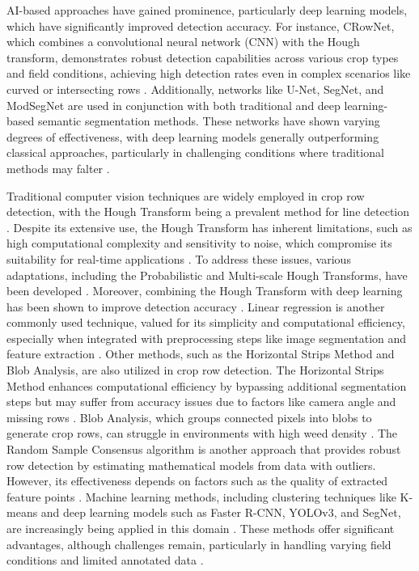 \documentclass[conference]{IEEEtran}
\begin{document}
AI-based approaches have gained prominence, particularly deep learning models, which have significantly improved detection accuracy. For instance, CRowNet, which combines a convolutional neural network (CNN) with the Hough transform, demonstrates robust detection capabilities across various crop types and field conditions, achieving high detection rates even in complex scenarios like curved or intersecting rows \cite{b8,b14}. Additionally, networks like U-Net, SegNet, and ModSegNet are used in conjunction with both traditional and deep learning-based semantic segmentation methods. These networks have shown varying degrees of effectiveness, with deep learning models generally outperforming classical approaches, particularly in challenging conditions where traditional methods may falter \cite{b5,b13}.

Traditional computer vision techniques are widely employed in crop row detection, with the Hough Transform being a prevalent method for line detection \cite{b2,b15}. Despite its extensive use, the Hough Transform has inherent limitations, such as high computational complexity and sensitivity to noise, which compromise its suitability for real-time applications \cite{b2}. To address these issues, various adaptations, including the Probabilistic and Multi-scale Hough Transforms, have been developed \cite{b2}. Moreover, combining the Hough Transform with deep learning has been shown to improve detection accuracy \cite{b8}. Linear regression is another commonly used technique, valued for its simplicity and computational efficiency, especially when integrated with preprocessing steps like image segmentation and feature extraction \cite{b2,b3}. Other methods, such as the Horizontal Strips Method and Blob Analysis, are also utilized in crop row detection. The Horizontal Strips Method enhances computational efficiency by bypassing additional segmentation steps but may suffer from accuracy issues due to factors like camera angle and missing rows \cite{b2}. Blob Analysis, which groups connected pixels into blobs to generate crop rows, can struggle in environments with high weed density \cite{b2}. The Random Sample Consensus algorithm is another approach that provides robust row detection by estimating mathematical models from data with outliers. However, its effectiveness depends on factors such as the quality of extracted feature points \cite{b2}. Machine learning methods, including clustering techniques like K-means and deep learning models such as Faster R-CNN, YOLOv3, and SegNet, are increasingly being applied in this domain \cite{b2,b5}. These methods offer significant advantages, although challenges remain, particularly in handling varying field conditions and limited annotated data \cite{b2,b5}.
\end{document}
